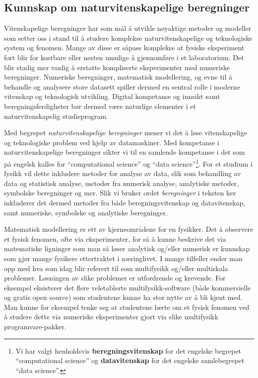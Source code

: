 \documentclass{article}
\begin{document}
\subsection{Kunnskap om naturvitenskapelige beregninger}
Vitenskapelige beregninger har som mål å utvikle nøyaktige metoder og modeller som setter oss i stand til å studere komplekse naturvitenskapelige og teknologiske system og fenomen. Mange av disse er såpass komplekse at fysiske eksperiment fort blir for kostbare eller nesten umulige å gjennomføre i et laboratorium. Det blir stadig mer vanlig å erstatte kompliserte eksperimenter med numeriske beregninger. Numeriske beregninger, matematisk modellering, og evne til å behandle og analysere store datasett spiller dermed en sentral rolle i moderne vitenskap og teknologisk utvikling. Digital kompetanse og innsikt samt beregningsferdigheter bør dermed være naturlige elementer i et naturvitenskapelig studieprogram.

Med begrepet \emph{naturvitenskapelige beregninger} mener vi det å løse vitenskapelige og teknologiske problem ved hjelp av datamaskiner.
Med kompetanse i naturvitenskapelige beregninger sikter vi til en samlende kompetanse i det som på engelsk kalles for ``computational science'' og ``data science''\footnote{Vi har valgt henholdsvis {\bf beregningsvitenskap} for det engelske begrepet ``computational science'' og {\bf datavitenskap} for det engelske samlebegrepet ``data science''.}. For et studium i fysikk vil dette inkludere metoder for analyse av data, slik som behandling av data og statistisk analyse, metoder fra numerisk analyse, analytiske metoder, symbolske beregninger og mer. Slik vi bruker ordet \emph{beregninger} i teksten her inkluderer det dermed metoder fra både beregningsvitenskap og datavitenskap, samt numeriske, symbolske og analytiske beregninger.

Matematisk modellering er ett av kjerneområdene for en fysikker. Det å observere et fysisk fenomen, ofte via eksperimenter, for så å kunne beskrive det via matematiske ligninger som man så løser analytisk og/eller numerisk er kunnskap som gjør mange fysikere ettertraktet i næringlivet. I mange tilfeller ender man opp med hva som idag blir referert til som multifysikk og/eller multiskala problemer. 
Løsningen av slike problemer er utfordrende og krevende. 
For eksempel eksisterer det flere veletablerte  multifysikk-software (både kommersielle og gratis open source) som studentene kunne ha stor nytte av å bli kjent med. 
Man kunne for eksempel tenke seg at studentene lærte om et fysisk fenomen ved å studere dette via numeriske eksperimenter gjort via slike multifysikk programvare-pakker.
\end{document}

